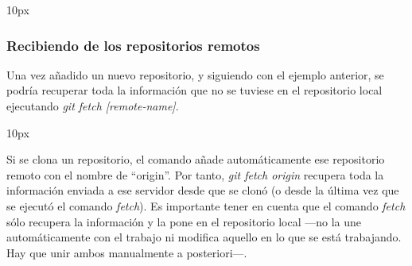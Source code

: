 \begin{center}{
	\fboxsep 10px
	}
\end{center}

\subsubsection{Recibiendo de los repositorios remotos}

Una vez añadido un nuevo repositorio, y siguiendo con el ejemplo anterior, se podría recuperar toda la información que no se tuviese en el repositorio local ejecutando {\it git fetch [remote-name]}.

\begin{center}{
	\fboxsep 10px
	}
\end{center}

Si se clona un repositorio, el comando añade automáticamente ese repositorio remoto con el nombre de ``origin''. Por tanto, {\it git fetch origin} recupera toda la información enviada a ese servidor desde que se clonó (o desde la última vez que se ejecutó el comando {\it fetch}). Es importante tener en cuenta que el comando {\it fetch} sólo recupera la información y la pone en el repositorio local ---no la une automáticamente con el trabajo ni modifica aquello en lo que se está trabajando. Hay que unir ambos manualmente a posteriori---.

